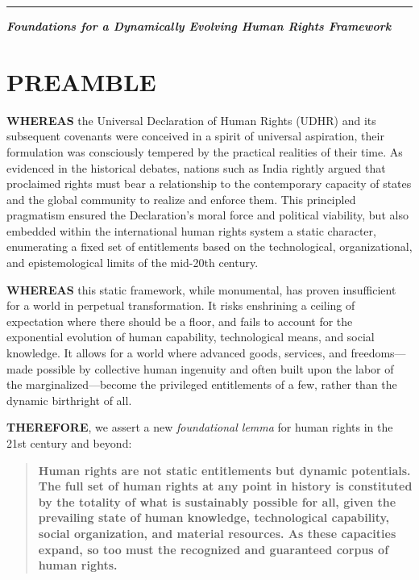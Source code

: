 \begin{center}\rule{0.5\linewidth}{0.5pt}\end{center}

\textbf{\emph{Foundations for a Dynamically Evolving Human Rights
Framework}}

\section{PREAMBLE}\label{preamble}

\textbf{WHEREAS} the Universal Declaration of Human Rights (UDHR) and
its subsequent covenants were conceived in a spirit of universal
aspiration, their formulation was consciously tempered by the practical
realities of their time. As evidenced in the historical debates, nations
such as India rightly argued that proclaimed rights must bear a
relationship to the contemporary capacity of states and the global
community to realize and enforce them. This principled pragmatism
ensured the Declaration's moral force and political viability, but also
embedded within the international human rights system a static
character, enumerating a fixed set of entitlements based on the
technological, organizational, and epistemological limits of the
mid-20th century.

\textbf{WHEREAS} this static framework, while monumental, has proven
insufficient for a world in perpetual transformation. It risks
enshrining a ceiling of expectation where there should be a floor, and
fails to account for the exponential evolution of human capability,
technological means, and social knowledge. It allows for a world where
advanced goods, services, and freedoms---made possible by collective
human ingenuity and often built upon the labor of the
marginalized---become the privileged entitlements of a few, rather than
the dynamic birthright of all.

\textbf{THEREFORE}, we assert a new \emph{foundational lemma} for human
rights in the 21st century and beyond:

\begin{quote}
\textbf{Human rights are not static entitlements but dynamic potentials.
The full set of human rights at any point in history is constituted by
the totality of what is sustainably possible for all, given the
prevailing state of human knowledge, technological capability, social
organization, and material resources. As these capacities expand, so too
must the recognized and guaranteed corpus of human rights.}
\end{quote}

